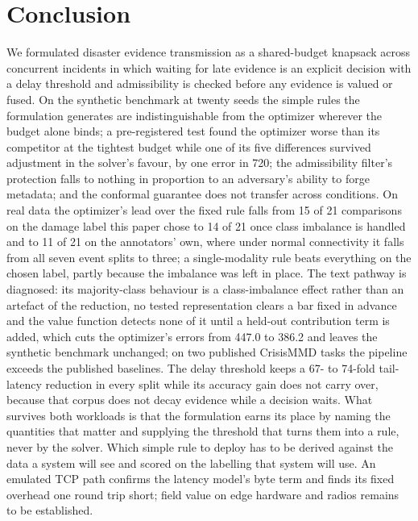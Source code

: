 \documentclass[conference,a4paper]{IEEEtran}
\newif\ifsubmission
\newcommand{\masteronly}[1]{\ifsubmission\else#1\fi}
\begin{document}
\section{Conclusion}
We formulated disaster evidence transmission as a shared-budget knapsack across concurrent
incidents in which waiting for late evidence is an explicit decision with a delay threshold
and admissibility is checked before any evidence is valued or fused. On the synthetic
benchmark at twenty seeds the simple rules the formulation generates are indistinguishable
from the optimizer wherever the budget alone binds; a pre-registered test found the
optimizer worse than its competitor at the tightest budget while one of its five
differences survived adjustment in the solver's favour, by one error in 720; the
admissibility filter's protection falls to nothing in proportion to an adversary's ability
to forge metadata; and the conformal guarantee does not transfer across conditions. On real
data the optimizer's lead over the fixed rule falls from 15 of 21 comparisons on the damage
label this paper chose to 14 of 21 once class imbalance is handled and to 11 of 21 on the annotators' own, where under normal connectivity it falls from all seven event splits to three; a single-modality rule beats everything on the chosen label, partly because the imbalance was left in place. The text pathway is diagnosed: its majority-class behaviour is a
class-imbalance effect rather than an artefact of the reduction, no tested representation clears a bar fixed in advance and the value function detects none of it until a held-out contribution term is added, which cuts the optimizer's errors from 447.0 to 386.2 and leaves the synthetic benchmark unchanged; on two published CrisisMMD tasks the pipeline exceeds the published baselines. The delay
threshold keeps a 67- to 74-fold tail-latency reduction in every split while its accuracy gain does not carry over, because that corpus does not decay evidence while a decision waits.
What survives both workloads is that the formulation earns its place by naming the
quantities that matter and supplying the threshold that turns them into a rule, never by
the solver.\masteronly{ Which simple rule to deploy has to be derived against the data a system will see and scored on the labelling that system will use.} An emulated TCP path confirms the latency model's byte term and finds its fixed overhead one round trip short; field value on edge hardware and radios remains to be established.
\end{document}
